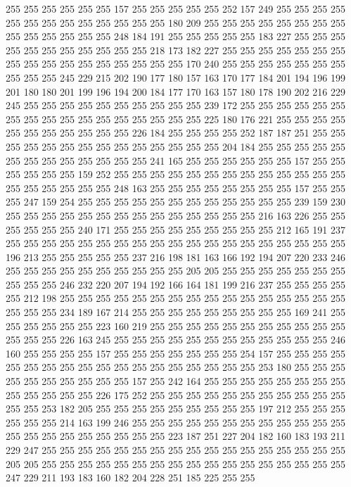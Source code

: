 255 255 255 255 255 255 157 255 255 255 255 255 252 157 249 255 255 255 255 255
255 255 255 255 255 255 255 255 180 209 255 255 255 255 255 255 255 255 255 255
255 255 255 255 248 184 191 255 255 255 255 255 183 227 255 255 255 255 255 255
255 255 255 255 255 218 173 182 227 255 255 255 255 255 255 255 255 255 255 255
255 255 255 255 255 255 170 240 255 255 255 255 255 255 255 255 255 255 245 229
215 202 190 177 180 157 163 170 177 184 201 194 196 199 201 180 180 201 199 196
194 200 184 177 170 163 157 180 178 190 202 216 229 245 255 255 255 255 255 255
255 255 255 255 239 172 255 255 255 255 255 255 255 255 255 255 255 255 255 255
255 255 255 225 180 176 221 255 255 255 255 255 255 255 255 255 255 255 226 184
255 255 255 255 252 187 187 251 255 255 255 255 255 255 255 255 255 255 255 255
255 255 204 184 255 255 255 255 255 255 255 255 255 255 255 255 255 241 165 255
255 255 255 255 255 157 255 255 255 255 255 255 159 252 255 255 255 255 255 255
255 255 255 255 255 255 255 255 255 255 255 255 255 248 163 255 255 255 255 255
255 255 255 157 255 255 255 247 159 254 255 255 255 255 255 255 255 255 255 255
255 255 239 159 230 255 255 255 255 255 255 255 255 255 255 255 255 255 255 216
163 226 255 255 255 255 255 255 240 171 255 255 255 255 255 255 255 255 255 212
165 191 237 255 255 255 255 255 255 255 255 255 255 255 255 255 255 255 255 255
255 255 196 213 255 255 255 255 255 237 216 198 181 163 166 192 194 207 220 233
246 255 255 255 255 255 255 255 255 255 255 205 205 255 255 255 255 255 255 255
255 255 255 246 232 220 207 194 192 166 164 181 199 216 237 255 255 255 255 255
212 198 255 255 255 255 255 255 255 255 255 255 255 255 255 255 255 255 255 255
255 234 189 167 214 255 255 255 255 255 255 255 255 255 169 241 255 255 255 255
255 255 223 160 219 255 255 255 255 255 255 255 255 255 255 255 255 255 255 226
163 245 255 255 255 255 255 255 255 255 255 255 255 255 246 160 255 255 255 255
157 255 255 255 255 255 255 255 254 157 255 255 255 255 255 255 255 255 255 255
255 255 255 255 255 255 255 255 253 180 255 255 255 255 255 255 255 255 255 255
157 255 242 164 255 255 255 255 255 255 255 255 255 255 255 255 255 226 175 252
255 255 255 255 255 255 255 255 255 255 255 255 255 253 182 205 255 255 255 255
255 255 255 255 255 197 212 255 255 255 255 255 255 214 163 199 246 255 255 255
255 255 255 255 255 255 255 255 255 255 255 255 255 255 255 255 255 255 223 187
251 227 204 182 160 183 193 211 229 247 255 255 255 255 255 255 255 255 255 255
255 255 255 255 255 255 255 205 205 255 255 255 255 255 255 255 255 255 255 255
255 255 255 255 255 255 247 229 211 193 183 160 182 204 228 251 185 225 255 255
